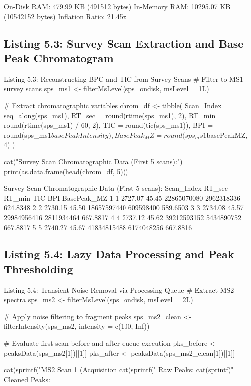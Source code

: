 \documentclass[11pt,twoside,openright]{book}
\begin{document}
\begin{routput}
On-Disk RAM:   479.99 KB (491512 bytes)
In-Memory RAM: 10295.07 KB (10542152 bytes)
Inflation Ratio: 21.45x
\end{routput}

\subsection{Listing 5.3: Survey Scan Extraction and Base Peak Chromatogram}

\begin{rchunk}{Listing 5.3: Reconstructing BPC and TIC from Survey Scans}
# Filter to MS1 survey scans
sps_ms1 <- filterMsLevel(sps_ondisk, msLevel = 1L)

# Extract chromatographic variables
chrom_df <- tibble(
  Scan_Index  = seq_along(sps_ms1),
  RT_sec      = round(rtime(sps_ms1), 2),
  RT_min      = round(rtime(sps_ms1) / 60, 2),
  TIC         = round(tic(sps_ms1)),
  BPI         = round(sps_ms1$basePeakIntensity),
  BasePeak_MZ = round(sps_ms1$basePeakMZ, 4)
)

cat("Survey Scan Chromatographic Data (First 5 scans):\n")
print(as.data.frame(head(chrom_df, 5)))
\end{rchunk}

\begin{routput}
Survey Scan Chromatographic Data (First 5 scans):
  Scan\_Index  RT\_sec RT\_min         TIC        BPI BasePeak\_MZ
1          1 2727.07  45.45 22865070080 2962318336    624.8348
2          2 2730.15  45.50 18657597440  609598400    589.6503
3          3 2734.08  45.57 29984956416 2811934464    667.8817
4          4 2737.12  45.62 39212593152 5434890752    667.8817
5          5 2740.27  45.67 41834815488 6174048256    667.8816
\end{routput}

\subsection{Listing 5.4: Lazy Data Processing and Peak Thresholding}

\begin{rchunk}{Listing 5.4: Transient Noise Removal via Processing Queue}
# Extract MS2 spectra
sps_ms2 <- filterMsLevel(sps_ondisk, msLevel = 2L)

# Apply noise filtering to fragment peaks
sps_ms2_clean <- filterIntensity(sps_ms2, intensity = c(100, Inf))

# Evaluate first scan before and after queue execution
pks_before <- peaksData(sps_ms2[1])[[1]]
pks_after  <- peaksData(sps_ms2_clean[1])[[1]]

cat(sprintf("MS2 Scan 1 (Acquisition %
cat(sprintf("  Raw Peaks:     %
cat(sprintf("  Cleaned Peaks: %
\end{rchunk}
\end{document}
